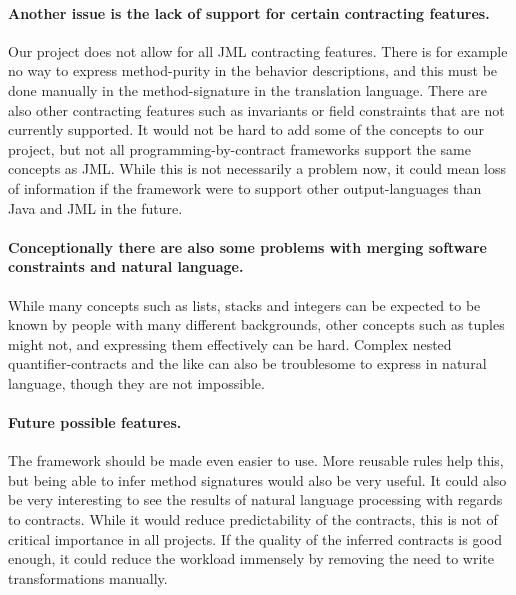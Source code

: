 \paragraph{Another issue is the lack of support for certain contracting features.}
Our project does not allow for all JML contracting features.
There is for example no way to express method-purity in the behavior descriptions, and this must be done manually in the method-signature in the translation language.
There are also other contracting features such as invariants or field constraints that are not currently supported.
It would not be hard to add some of the concepts to our project, but not all programming-by-contract frameworks support the same concepts as JML.
While this is not necessarily a problem now, it could mean loss of information if the framework were to support other output-languages than Java and JML in the future.

\paragraph{Conceptionally there are also some problems with merging software constraints and natural language.}
While many concepts such as lists, stacks and integers can be expected to be known by people with many different backgrounds, other concepts such as tuples might not, and expressing them effectively can be hard.
Complex nested quantifier-contracts and the like can also be troublesome to express in natural language, though they are not impossible.

\paragraph{Future possible features.}
The framework should be made even easier to use.
More reusable rules help this, but being able to infer method signatures would also be very useful.
It could also be very interesting to see the results of natural language processing with regards to contracts.
While it would reduce predictability of the contracts, this is not of critical importance in all projects.
If the quality of the inferred contracts is good enough, it could reduce the workload immensely by removing the need to write transformations manually.